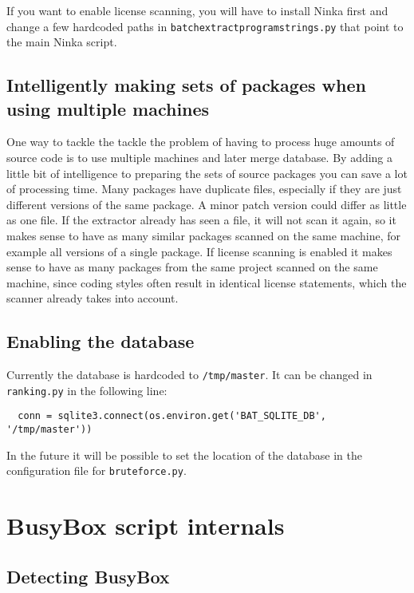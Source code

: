\documentclass[10pt]{article}
\begin{document}
If you want to enable license scanning, you will have to install Ninka first
and change a few hardcoded paths in \texttt{batchextractprogramstrings.py} that
point to the main Ninka script.

\subsection{Intelligently making sets of packages when using multiple machines}

One way to tackle the tackle the problem of having to process huge amounts of
source code is to use multiple machines and later merge database. By adding a
little bit of intelligence to preparing the sets of source packages you can
save a lot of processing time. Many packages have duplicate files, especially
if they are just different versions of the same package. A minor patch version
could differ as little as one file. If the extractor already has seen a file, it
will not scan it again, so it makes sense to have as many similar packages
scanned on the same machine, for example all versions of a single package. If
license scanning is enabled it makes sense to have as many packages from the
same project scanned on the same machine, since coding styles often result in
identical license statements, which the scanner already takes into account.

\subsection{Enabling the database}

Currently the database is hardcoded to \texttt{/tmp/master}. It can be changed
in \texttt{ranking.py} in the following line:

\begin{verbatim}
  conn = sqlite3.connect(os.environ.get('BAT_SQLITE_DB', '/tmp/master'))
\end{verbatim}

In the future it will be possible to set the location of the database in the
configuration file for \texttt{bruteforce.py}.

\section{BusyBox script internals}

\subsection{Detecting BusyBox}
\end{document}
